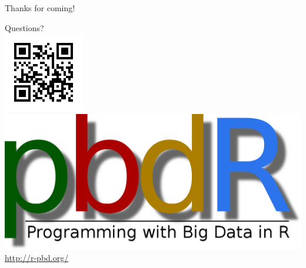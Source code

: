 \begin{frame}[noframenumbering]
 \begin{block}{Thanks for coming!}
 \begin{center}
 \vspace{.4cm}
     {\Huge Questions?}\\[.8cm]
\includegraphics[scale=.35]{../common/pics/pbdqr}\includegraphics[scale=.1]{../common/pics/newpbdr}
\\
\url{http://r-pbd.org/}
  \end{center}
 \end{block}
\end{frame}
